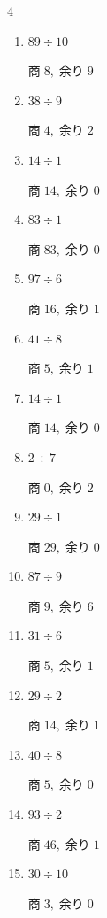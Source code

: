 \begin{multicols}{4}
\begin{enumerate}
        $商\; 0,\; 余り\; 6$

  \item $89 \div 10$

        $商\; 8,\; 余り\; 9$

  \item $38 \div 9$

        $商\; 4,\; 余り\; 2$

  \item $14 \div 1$

        $商\; 14,\; 余り\; 0$

  \item $83 \div 1$

        $商\; 83,\; 余り\; 0$

  \item $97 \div 6$

        $商\; 16,\; 余り\; 1$

  \item $41 \div 8$

        $商\; 5,\; 余り\; 1$

  \item $14 \div 1$

        $商\; 14,\; 余り\; 0$

  \item $2 \div 7$

        $商\; 0,\; 余り\; 2$

  \item $29 \div 1$

        $商\; 29,\; 余り\; 0$

  \item $87 \div 9$

        $商\; 9,\; 余り\; 6$

  \item $31 \div 6$

        $商\; 5,\; 余り\; 1$

  \item $29 \div 2$

        $商\; 14,\; 余り\; 1$

  \item $40 \div 8$

        $商\; 5,\; 余り\; 0$

  \item $93 \div 2$

        $商\; 46,\; 余り\; 1$

  \item $30 \div 10$

        $商\; 3,\; 余り\; 0$


\end{enumerate}
\end{multicols}
